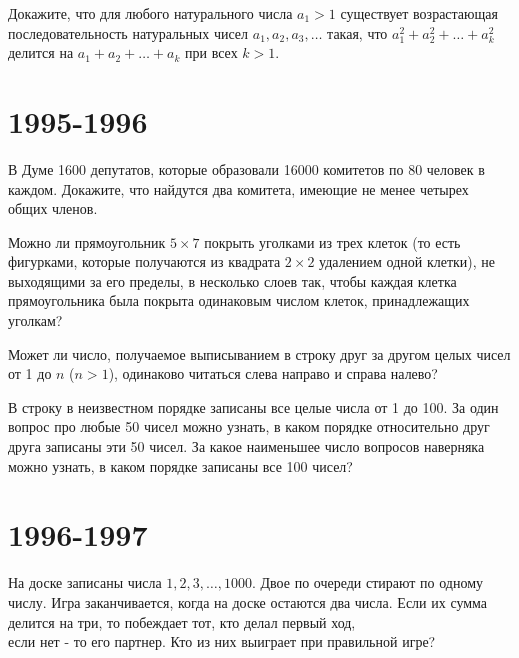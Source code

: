 \documentclass[11pt, a4paper]{problems_template}
\begin{document}
\begin{Solution}
 
\end{Solution}

\begin{exercise}
Докажите, что для любого натурального числа $a_{1} > 1$ существует возрастающая последовательность натуральных чисел $a_{1}, a_{2}, a_{3}, \dots$ такая, что $a_{1}^{2} + a_{2}^{2} + \dots + a_{k}^{2}$ делится на $a_{1} + a_{2} + \dots + a_{k}$ при всех $k > 1$.
\end{exercise}

\chapter{1995-1996}

\begin{exercise}
В Думе 1600 депутатов, которые образовали 16000 комитетов по
80 человек в каждом. Докажите, что найдутся два комитета, имеющие не
менее четырех общих членов.
\end{exercise}

\begin{exercise}
Можно ли прямоугольник $5 \times 7$ покрыть уголками из трех клеток
(то есть фигурками, которые получаются из квадрата $2 \times 2$ удалением одной клетки), не выходящими за его пределы, в несколько слоев так, чтобы каждая клетка прямоугольника была покрыта одинаковым числом клеток, принадлежащих уголкам?
\end{exercise}

\begin{exercise}
Может ли число, получаемое выписыванием в строку друг за другом целых чисел от 1 до $n$ ($n > 1$), одинаково читаться слева направо и справа налево?
\end{exercise}

\begin{exercise}
В строку в неизвестном порядке записаны все целые числа от 1 до
100. За один вопрос про любые 50 чисел можно узнать, в каком порядке относительно друг друга записаны эти 50 чисел. За какое наименьшее число вопросов наверняка можно узнать, в каком порядке записаны все 100 чисел?
\end{exercise}

\chapter{1996-1997}

\begin{exercise}
На доске записаны числа $1, 2, 3, \dots, 1000$. Двое по очереди стирают по одному числу. Игра заканчивается, когда на доске остаются два числа. Если их сумма делится на три, то побеждает тот, кто делал первый ход, \\ если нет - то его партнер. Кто из них выиграет при правильной игре?
\end{exercise}
\end{document}
